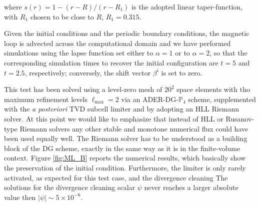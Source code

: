%  
where $s(r) = 1 - (r-R)/(r-R_1)$ is the adopted linear taper-function,
with $R_1$ chosen to be close to $R$, \eg $R_1=0.315$.

Given the initial conditions and the periodic boundary conditions, the
magnetic loop is advected across the computational
domain and we have performed simulations using the lapse function set
either to $\alpha = 1$ or to $\alpha = 2$, so that the corresponding
simulation times to recover the initial configuration are $t=5$ and $t=2.5$,
respectively; conversely,
the shift vector $\beta^i$ is set to zero.

This test has been solved using a level-zero mesh of $20^2$ space
elements with tho maximum refinement levels $\ell_{\text{max}}=2$ via an
ADER-DG-$\mathbb{P}_4$ scheme, supplemented with the \textit{a posteriori}  TVD
subcell limiter and by adopting an HLL Riemann solver. At this point we
would like to emphasize that instead of HLL or Rusanov-type Riemann
solvers any other stable and monotone numerical flux could have been used
equally well. The Riemann solver has to be understood as a building block
of the DG scheme, exactly in the same way as it is in the finite-volume
context.  Figure \ref{fig:ML_B} reports the numerical results, which
basically show the preservation of the initial condition.
Furthermore, the limiter is only rarely activated, as expected for this test
case, and the divergence cleaning  The solutions for the divergence cleaning 
scalar $\psi$ never reaches a larger absolute value then
$|\psi| \sim 5\times10^{-6}$.

